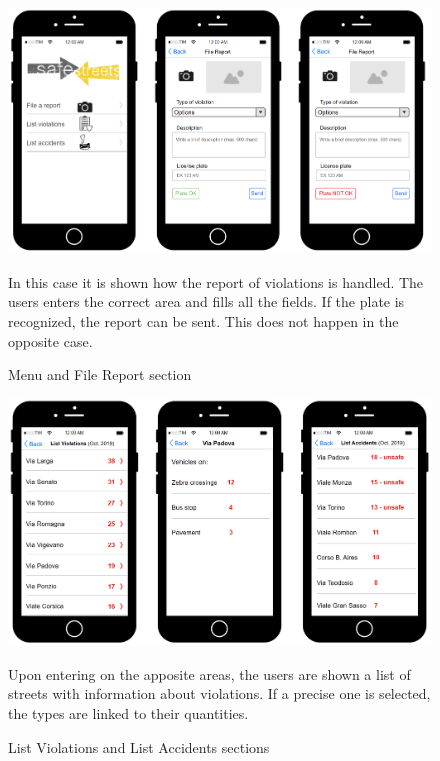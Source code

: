 \begin{figure} [H]
\includegraphics[scale=0.47]{Images/Templates/User/us_3.PNG}
\caption{\label{fig:Mockup-2}Menu and File Report section}
In this case it is shown how the report of violations is handled. The users enters the correct area and fills all the fields. If the plate is recognized, the report can be sent. This does not happen in the opposite case.
\end{figure}


\begin{figure}[H]
\includegraphics[scale=0.5]{Images/Templates/User/us_4.PNG}
\caption{\label{fig:Mockup-3}List Violations and List Accidents sections}
Upon entering on the apposite areas, the users are shown a list of streets with information about violations. If a precise one is selected, the types are linked to their quantities.
\end{figure}



